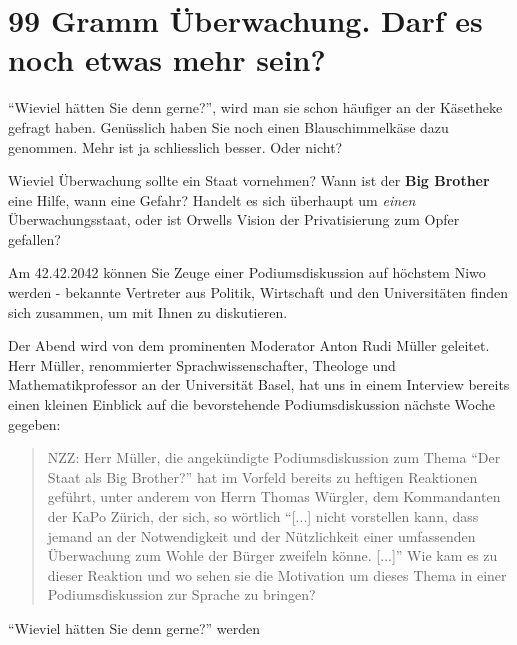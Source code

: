 \documentclass{scrartcl}
\begin{document}
\section*{99 Gramm Überwachung. Darf es noch etwas mehr sein?}
"`Wieviel hätten Sie denn gerne?"', wird man sie schon
häufiger an der Käsetheke gefragt haben. Genüsslich haben
Sie noch einen Blauschimmelkäse dazu genommen. Mehr ist ja
schliesslich besser. Oder nicht?

Wieviel Überwachung sollte ein Staat vornehmen? Wann ist
der \textbf{Big Brother} eine Hilfe, wann eine Gefahr?
Handelt es sich überhaupt um \textit{einen} Überwachungsstaat,
oder ist Orwells Vision der Privatisierung zum Opfer gefallen?

Am 42.42.2042 können Sie Zeuge einer Podiumsdiskussion auf
höchstem Niwo werden - bekannte Vertreter aus Politik, Wirtschaft
und den Universitäten finden sich zusammen, um mit Ihnen
zu diskutieren.

Der Abend wird von dem prominenten Moderator Anton Rudi Müller
geleitet. Herr Müller, renommierter Sprachwissenschafter, Theologe
und Mathematikprofessor an der Universität Basel, hat uns in
einem Interview bereits einen kleinen Einblick auf die 
bevorstehende Podiumsdiskussion nächste Woche gegeben:

\begin{quote}
NZZ: Herr Müller, die angekündigte Podiumsdiskussion zum Thema
"`Der Staat als Big Brother?"' hat im Vorfeld bereits zu
heftigen Reaktionen geführt, unter anderem von Herrn
Thomas Würgler, dem Kommandanten der KaPo Zürich, der
sich, so wörtlich "`[...] nicht vorstellen kann, dass jemand
an der Notwendigkeit und der Nützlichkeit einer umfassenden
Überwachung zum Wohle der Bürger zweifeln könne. [...]"'
Wie kam es zu dieser Reaktion und wo sehen sie die Motivation
um dieses Thema in einer Podiumsdiskussion zur Sprache zu
bringen?
\end{quote}

"`Wieviel hätten Sie denn gerne?"' werden 
\end{document}
